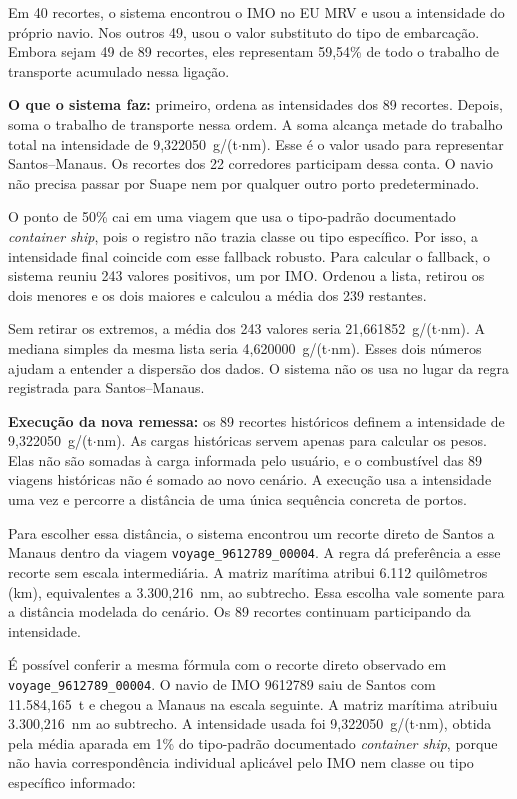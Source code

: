\documentclass[12pt,a4paper]{article}
\begin{document}
Em 40 recortes, o sistema encontrou o IMO no EU MRV e usou a intensidade do próprio navio. Nos outros 49, usou o valor substituto do tipo de embarcação. Embora sejam 49 de 89 recortes, eles representam 59,54\% de todo o trabalho de transporte acumulado nessa ligação.

\textbf{O que o sistema faz:} primeiro, ordena as intensidades dos 89 recortes. Depois, soma o trabalho de transporte nessa ordem. A soma alcança metade do trabalho total na intensidade de 9,322050~g/(t$\cdot$nm). Esse é o valor usado para representar Santos--Manaus. Os recortes dos 22 corredores participam dessa conta. O navio não precisa passar por Suape nem por qualquer outro porto predeterminado.

O ponto de 50\% cai em uma viagem que usa o tipo-padrão documentado \textit{container ship}, pois o registro não trazia classe ou tipo específico. Por isso, a intensidade final coincide com esse fallback robusto. Para calcular o fallback, o sistema reuniu 243 valores positivos, um por IMO. Ordenou a lista, retirou os dois menores e os dois maiores e calculou a média dos 239 restantes.

Sem retirar os extremos, a média dos 243 valores seria 21,661852~g/(t$\cdot$nm). A mediana simples da mesma lista seria 4,620000~g/(t$\cdot$nm). Esses dois números ajudam a entender a dispersão dos dados. O sistema não os usa no lugar da regra registrada para Santos--Manaus.

\textbf{Execução da nova remessa:} os 89 recortes históricos definem a intensidade de 9,322050~g/(t$\cdot$nm). As cargas históricas servem apenas para calcular os pesos. Elas não são somadas à carga informada pelo usuário, e o combustível das 89 viagens históricas não é somado ao novo cenário. A execução usa a intensidade uma vez e percorre a distância de uma única sequência concreta de portos.

Para escolher essa distância, o sistema encontrou um recorte direto de Santos a Manaus dentro da viagem \texttt{voyage\_9612789\_00004}. A regra dá preferência a esse recorte sem escala intermediária. A matriz marítima atribui 6.112 quilômetros (km), equivalentes a 3.300,216~nm, ao subtrecho. Essa escolha vale somente para a distância modelada do cenário. Os 89 recortes continuam participando da intensidade.

É possível conferir a mesma fórmula com o recorte direto observado em \nolinkurl{voyage_9612789_00004}. O navio de IMO 9612789 saiu de Santos com 11.584,165~t e chegou a Manaus na escala seguinte. A matriz marítima atribuiu 3.300,216~nm ao subtrecho. A intensidade usada foi 9,322050~g/(t$\cdot$nm), obtida pela média aparada em 1\% do tipo-padrão documentado \emph{container ship}, porque não havia correspondência individual aplicável pelo IMO nem classe ou tipo específico informado:
\end{document}
